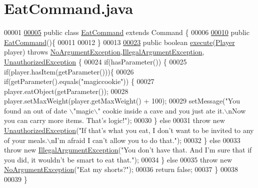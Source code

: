 \hypertarget{EatCommand_8java_source}{\section{Eat\-Command.\-java}
}

\begin{DoxyCode}
00001 
\hypertarget{EatCommand_8java_source_l00005}{}\hyperlink{classEatCommand}{00005} \textcolor{keyword}{public} \textcolor{keyword}{class }\hyperlink{classEatCommand}{EatCommand} \textcolor{keyword}{extends} Command \{
00006 
\hypertarget{EatCommand_8java_source_l00010}{}\hyperlink{classEatCommand_ab142bb810d8beeb46c478148143182e7}{00010}     \textcolor{keyword}{public} \hyperlink{classEatCommand_ab142bb810d8beeb46c478148143182e7}{EatCommand}()\{
00011 
00012     \}
00013 
\hypertarget{EatCommand_8java_source_l00023}{}\hyperlink{classEatCommand_ab78ece6b005359a83696998a37f0ae71}{00023}     \textcolor{keyword}{public} \textcolor{keywordtype}{boolean} \hyperlink{classEatCommand_ab78ece6b005359a83696998a37f0ae71}{execute}(\hyperlink{classPlayer}{Player} player) \textcolor{keywordflow}{throws} 
      \hyperlink{classNoArgumentException}{NoArgumentException},\hyperlink{classIllegalArgumentException}{IllegalArgumentException},
      \hyperlink{classUnauthorizedException}{UnauthorizedException} \{
00024         \textcolor{keywordflow}{if}(hasParameter()) \{
00025             \textcolor{keywordflow}{if}(player.hasItem(getParameter()))\{
00026                 \textcolor{keywordflow}{if}(getParameter().equals(\textcolor{stringliteral}{"magiccookie"})) \{
00027                     player.eatObject(getParameter());
00028                     player.setMaxWeight(player.getMaxWeight() + 100);
00029                     setMessage(\textcolor{stringliteral}{"You found an out of date \(\backslash\)"magic\(\backslash\)" cookie inside a cave and you just ate
       it.\(\backslash\)nNow you can carry more items. That's logic!"});
00030                 \} \textcolor{keywordflow}{else}
00031                     \textcolor{keywordflow}{throw} \textcolor{keyword}{new} \hyperlink{classUnauthorizedException}{UnauthorizedException}(\textcolor{stringliteral}{"If that's what you eat, I don't
       want to be invited to any of your meals.\(\backslash\)nI'm afraid I can't allow you to do that."});
00032             \} \textcolor{keywordflow}{else} 
00033                 \textcolor{keywordflow}{throw} \textcolor{keyword}{new} \hyperlink{classIllegalArgumentException}{IllegalArgumentException}(\textcolor{stringliteral}{"You don't have that. And I'm
       sure that if you did, it wouldn't be smart to eat that."});
00034         \} \textcolor{keywordflow}{else} 
00035             \textcolor{keywordflow}{throw} \textcolor{keyword}{new} \hyperlink{classNoArgumentException}{NoArgumentException}(\textcolor{stringliteral}{"Eat my shorts?"});
00036         \textcolor{keywordflow}{return} \textcolor{keyword}{false};
00037     \}
00038 
00039 \}
\end{DoxyCode}
